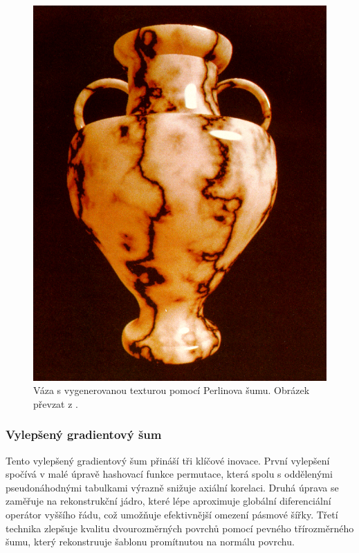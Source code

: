\begin{figure}[H]
	\centering
	\includegraphics[scale=0.3]{obrazky-figures/PerlinNoiseVase.png}
	\caption{Váza s vygenerovanou texturou pomocí Perlinova šumu. Obrázek převzat z \cite{PerlinKen}.}
	\label{PerlinVase}
\end{figure}

\subsubsection{Vylepšený gradientový šum}
Tento vylepšený gradientový šum přináší tři klíčové inovace. První vylepšení spočívá v malé úpravě hashovací funkce permutace, která spolu s oddělenými pseudonáhodnými tabulkami výrazně snižuje axiální korelaci. Druhá úprava se zaměřuje na rekonstrukční jádro, které lépe aproximuje globální diferenciální operátor vyššího řádu, což umožňuje efektivnější omezení pásmové šířky. Třetí technika zlepšuje kvalitu dvourozměrných povrchů pomocí pevného třírozměrného šumu, který rekonstruuje šablonu promítnutou na normálu povrchu. \cite{Kensler2008}


